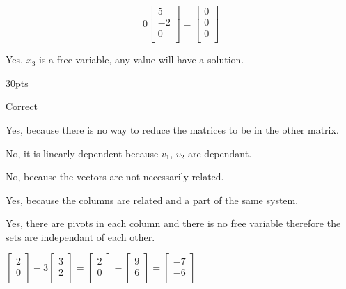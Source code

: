 \begin{prob}
\begin{subprob}
$$0\begin{bmatrix}
   5\\
   -2\\
   0\\
\end{bmatrix} = \begin{bmatrix}
   0\\
   0\\
   0\\
\end{bmatrix}$$
\end{subprob}
\begin{subprob}
Yes, $x_3$ is a free variable, any value will have a solution.
\end{subprob}
\end{prob}
\begin{prob} 30pts
\begin{subprob}
Correct
\end{subprob}
\begin{subprob}
Yes, because there is no way to reduce the matrices to be in the other matrix.
\end{subprob}
\begin{subprob}
No, it is linearly dependent because $v_1$, $v_2$ are dependant.
\end{subprob}
\begin{subprob}
No, because the vectors are not necessarily related.
\end{subprob}
\begin{subprob}
Yes, because the columns are related and a part of the same system.
\end{subprob}
\begin{subprob}
Yes, there are pivots in each column and there is no free variable therefore the sets are independant of each other.
\end{subprob}
\end{prob}
\begin{prob}
$\begin{bmatrix}
   2\\
   0\\
\end{bmatrix}-3\begin{bmatrix}
   3\\
   2\\
\end{bmatrix}=\begin{bmatrix}
   2\\
   0\\
\end{bmatrix}-\begin{bmatrix}
   9\\
   6\\
\end{bmatrix}=\begin{bmatrix}
   -7\\
   -6\\
\end{bmatrix}$
\end{prob}
